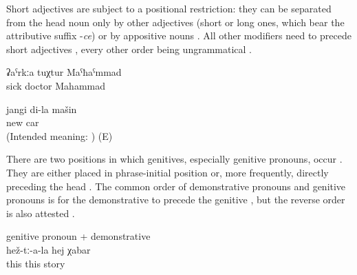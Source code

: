 Short adjectives are subject to a positional restriction: they can be separated from the head noun only by other adjectives (short or long ones, which bear the attributive suffix -\textit{ce})  or by appositive nouns . All other modifiers need to precede short adjectives , every other order being ungrammatical .
%
\begin{exe}
	\ex	\label{ex:the sick doctor Mahammad}
	\gll	ʡaˁrkːa	tuχtur	Maˁħaˁmmad\\
		sick doctor	Mahammad\\
	\glt	{}

	\ex	\label{ex:my new car ungrammatical}
	\gll	* jangi di-la mašin\\
		{} new		car\\
	\glt	(Intended meaning: ) (E)
\end{exe}


There are two positions in which genitives, especially genitive pronouns, occur . They are either placed in phrase-initial position  or, more frequently, directly preceding the head . The common order of demonstrative pronouns and genitive pronouns is for the demonstrative to precede the genitive , but the reverse order is also attested .
%
\begin{exe}
		\ex	genitive pronoun + demonstrative\\	\label{ex:their this story@11a}
		\gll	hež-tː-a-la	hej	χabar\\
			this	this	story\\
		\glt	{}
\end{exe}

